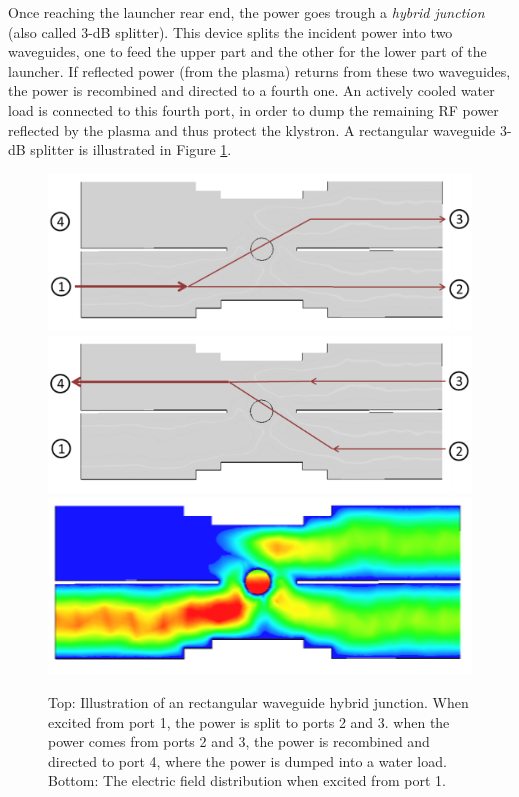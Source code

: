 Once reaching the launcher rear end, the power goes trough a \textit{hybrid junction} (also called 3-dB splitter). This device splits the incident power into two waveguides, one to feed the upper part and the other for the lower part of the launcher.  If reflected power (from the plasma) returns from these two waveguides, the power is recombined and directed to a fourth one. An actively cooled water load is connected to this fourth port, in order to dump the remaining RF power reflected by the plasma and thus protect the klystron. A rectangular waveguide 3-dB splitter is illustrated in Figure \ref{fig:hybridjunction1}. 

\begin{figure}
\centering
\includegraphics[width=0.4\linewidth]{Figures/LHCD/HybridJunction1}
\includegraphics[width=0.4\linewidth]{Figures/LHCD/HybridJunction2}
\includegraphics[width=0.4\linewidth]{Figures/LHCD/HybridJunction_Efield}
\caption{Top: Illustration of an rectangular waveguide hybrid junction. When excited from port 1, the power is split to ports 2 and 3. when the power comes from ports 2 and 3, the power is recombined and directed to port 4, where the power is dumped into a water load. Bottom: The electric field distribution when excited from port 1. }
\label{fig:hybridjunction1}
\end{figure}


